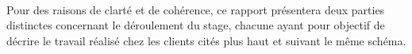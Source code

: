 \paragraph{}
Pour des raisons de clarté et de cohérence, ce rapport présentera deux parties distinctes concernant le déroulement du stage, chacune ayant pour objectif de décrire le travail réalisé chez les clients cités plus haut et suivant le même schéma.